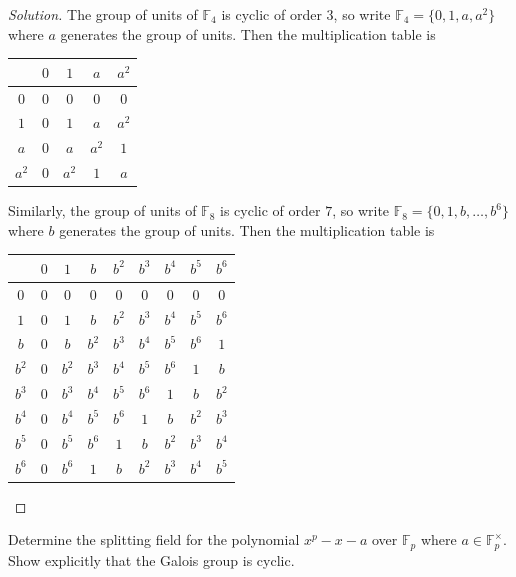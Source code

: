 \documentclass[10pt]{article}
\providecommand{\FF}{\mathbb F}
\newenvironment{soln}{\begin{proof}[Solution]}{\end{proof}}
\begin{document}
\begin{soln}
    The group of units of $\FF_4$ is cyclic of order $3$,
    so write $\FF_4 = \{0, 1, a, a^2\}$ where $a$
    generates the group of units. Then the multiplication table is
    \begin{center}
	\begin{tabular}{c | cccc}
	    & $0$ & $1$ & $a$ & $a^2$\\
	    \hline
	    $0$ & $0$ & $0$ & $0$ & $0$\\
	    $1$ & $0$ & $1$ & $a$ & $a^2$\\
	    $a$ & $0$ & $a$ & $a^2$ & $1$\\
	    $a^2$ & $0$ & $a^2$ & $1$ & $a$
	\end{tabular}
    \end{center}
    Similarly, the group of units of $\FF_8$ is cyclic of order $7$,
    so write $\FF_8 = \{0, 1, b, \dots, b^6\}$
    where $b$ generates the group of units.
    Then the multiplication table is
    \begin{center}
	\begin{tabular}{c|cccccccc}
	    &$0$&$1$&$b$&$b^2$&$b^3$&$b^4$&$b^5$&$b^6$\\
	    \hline
	    $0$&$0$&$0$&$0$&$0$&$0$&$0$&$0$&$0$\\
	    $1$&$0$&$1$&$b$&$b^2$&$b^3$&$b^4$&$b^5$&$b^6$\\
	    $b$&$0$&$b$&$b^2$&$b^3$&$b^4$&$b^5$&$b^6$&$1$\\
	    $b^2$&$0$&$b^2$&$b^3$&$b^4$&$b^5$&$b^6$&$1$&$b$\\
	    $b^3$&$0$&$b^3$&$b^4$&$b^5$&$b^6$&$1$&$b$&$b^2$\\
	    $b^4$&$0$&$b^4$&$b^5$&$b^6$&$1$&$b$&$b^2$&$b^3$\\
	    $b^5$&$0$&$b^5$&$b^6$&$1$&$b$&$b^2$&$b^3$&$b^4$\\
	    $b^6$&$0$&$b^6$&$1$&$b$&$b^2$&$b^3$&$b^4$&$b^5$\\
        \end{tabular}
    \end{center}
\end{soln}

\begin{problem}
    [\S14.3\#8]
    Determine the splitting field for the polynomial $x^p - x - a$
    over $\FF_p$ where $a\in\FF_p^\times$. Show explicitly
    that the Galois group is cyclic.
\end{problem}
\end{document}
